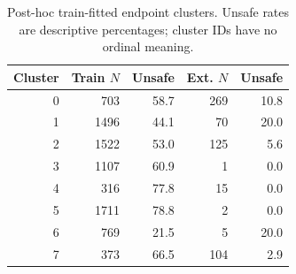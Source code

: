 \begin{table}[t]
\centering\footnotesize
\caption{Post-hoc train-fitted endpoint clusters. Unsafe rates are descriptive percentages; cluster IDs have no ordinal meaning.}\label{tab:clusters}
\begin{tabular}{rrrrr}\toprule
Cluster & Train $N$ & Unsafe & Ext. $N$ & Unsafe \\
\midrule
0 & 703 & 58.7 & 269 & 10.8 \\
1 & 1496 & 44.1 & 70 & 20.0 \\
2 & 1522 & 53.0 & 125 & 5.6 \\
3 & 1107 & 60.9 & 1 & 0.0 \\
4 & 316 & 77.8 & 15 & 0.0 \\
5 & 1711 & 78.8 & 2 & 0.0 \\
6 & 769 & 21.5 & 5 & 20.0 \\
7 & 373 & 66.5 & 104 & 2.9 \\
\bottomrule\end{tabular}
\end{table}
